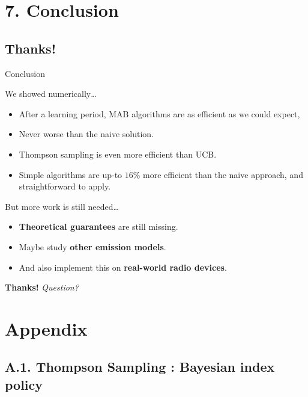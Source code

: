 \documentclass[12pt,english,ignorenonframetext,]{beamer}
\providecommand{\tightlist}{%
  \setlength{\itemsep}{0pt}\setlength{\parskip}{0pt}}
\begin{document}
\section{\hfill{}7. Conclusion\hfill{}}\subsection{\hfill{}Thanks!\hfill{}}

\begin{frame}{Conclusion}

\begin{block}{We showed numerically\ldots{}}

\begin{itemize}
\tightlist
\item
  After a learning period, MAB algorithms are as efficient as we could expect,
\item
  Never worse than the naive solution.
\item
  Thompson sampling is even more efficient than UCB.
\item
  Simple algorithms are up-to \(16\%\) more efficient than the naive
  approach, and straightforward to apply.
\end{itemize}

\end{block}

\begin{block}{But more work is still needed\ldots{}}

\begin{itemize}
\tightlist
\item
  \textbf{Theoretical guarantees} are still missing.
\item
  Maybe study \textbf{other emission models}.
\item
  And also implement this on \textbf{real-world radio devices}.
\end{itemize}

\end{block}

\hfill{} \textbf{Thanks!} \emph{Question?}

\end{frame}

\appendix
\backupbegin

\section{\hfill{}Appendix\hfill{}}

\subsection{\hfill{}A.1. Thompson Sampling : Bayesian index policy\hfill{}}
\end{document}
